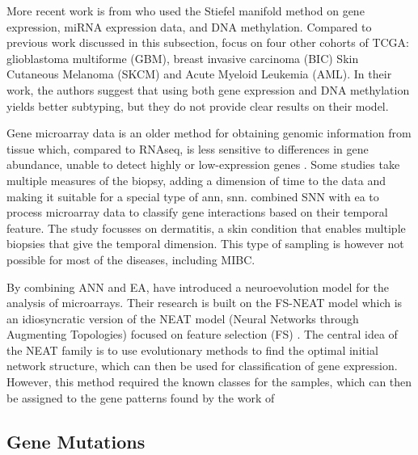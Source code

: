 More recent work is from \citet{Tian2021-vu} who used the Stiefel manifold method on gene expression, miRNA expression data, and DNA methylation. Compared to previous work discussed in this subsection, \citet{Tian2021-vu} focus on four other cohorts of TCGA: glioblastoma multiforme (GBM), breast invasive carcinoma (BIC) Skin Cutaneous Melanoma (SKCM) and Acute Myeloid Leukemia (AML). In their work, the authors suggest that using both gene expression and DNA methylation yields better subtyping, but they do not provide clear results on their model.

Gene microarray data is an older method for obtaining genomic information from tissue which, compared to RNAseq, is less sensitive to differences in gene abundance, unable to detect highly or low-expression genes \citep{Wang2009-lj}. Some studies take multiple measures of the biopsy, adding a dimension of time to the data and making it suitable for a special type of \acrfull{ann}, \acrfull{snn}. \citet{Capecci2020-uj} combined SNN with \acrfull{ea} to process microarray data to classify gene interactions based on their temporal feature. The study focusses on dermatitis, a skin condition that enables multiple biopsies that give the temporal dimension. This type of sampling is however not possible for most of the diseases, including MIBC.

By combining ANN and EA, \citet{Grisci2019-xn} have introduced a neuroevolution model for the analysis of microarrays. Their research is built on the FS-NEAT model \citep{Whiteson2005-dn} which is an idiosyncratic version of the NEAT model (Neural Networks through Augmenting Topologies) focused on feature selection (FS) \citep{Stanley2002-tg}. The central idea of the NEAT family is to use evolutionary methods to find the optimal initial network structure, which can then be used for classification of gene expression. However, this method required the known classes for the samples, which can then be assigned to the gene patterns found by the work of \citep{Grisci2019-xn}

\subsection{Gene Mutations} \label{s:lit:mutations}

\vspace{3mm}
\vspace{3mm}


